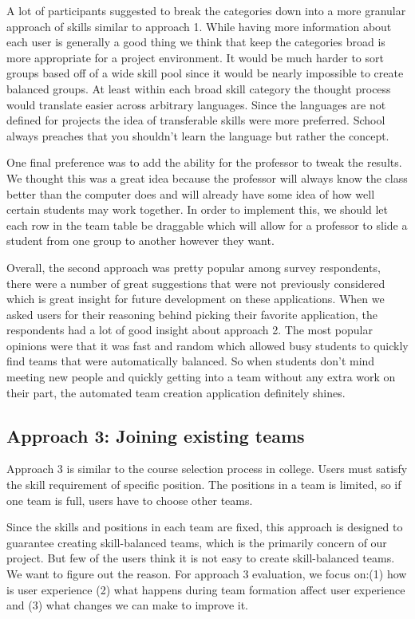 \documentclass[conference]{IEEEtran}
\begin{document}
A lot of participants suggested to break the categories down into a more granular approach of skills similar to approach 1. While having more information about each user is generally a good thing we think that keep the categories broad is more appropriate for a project environment. It would be much harder to sort groups based off of a wide skill pool since it would be nearly impossible to create balanced groups. At least within each broad skill category the thought process would translate easier across arbitrary languages. Since the languages are not defined for projects the idea of transferable skills were more preferred. School always preaches that you shouldn't learn the language but rather the concept. 

One final preference was to add the ability for the professor to tweak the results. We thought this was a great idea because the professor will always know the class better than the computer does and will already have some idea of how well certain students may work together. In order to implement this, we should let each row in the team table be draggable which will allow for a professor to slide a student from one group to another however they want. 

Overall, the second approach was pretty popular among survey respondents, there were a number of great suggestions that were not previously considered which is great insight for future development on these applications. When we asked users for their reasoning behind picking their favorite application, the respondents had a lot of good insight about approach 2. The most popular opinions were that it was fast and random which allowed busy students to quickly find teams that were automatically balanced. So when students don't mind meeting new people and quickly getting into a team without any extra work on their part, the automated team creation application definitely shines. 

\subsection{Approach 3: Joining existing teams}
Approach 3 is similar to the course selection process in college. Users must satisfy the skill requirement of specific position. The positions in a team is limited, so if one team is full, users have to choose other teams. 

Since the skills and positions in each team are fixed, this approach is designed to guarantee creating skill-balanced teams, which is the primarily concern of our project. But few of the users think it is not easy to create skill-balanced teams. We want to figure out the reason. For approach 3 evaluation, we focus on:(1) how is user experience (2) what happens during team formation affect user experience and (3) what changes we can make to improve it.
\end{document}
